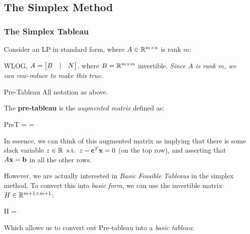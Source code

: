 \subsection{The Simplex Method}
\label{sec:simplex-method}

\subsubsection{The Simplex Tableau}

Consider an LP in standard form, where $A \in \mathbb{R}^{m \times n}$ is rank  $m$:

WLOG, $A = \begin{bmatrix} B & | & N \end{bmatrix}$. where $B = \mathbb{R}^{m\times m}$ invertible. \textit{Since
$A$ is rank $m$, we can row-reduce to make this true}.

\begin{defn}{Pre-Tableau}{}
All notation as above.

\medskip
The \textbf{pre-tableau} is the \textit{augmented matrix} defined as:

\begin{frml}
	PreT =  =
\end{frml}

\end{defn}

In essence, we can think of this augmented matrix as implying that there is some
slack variable $z \in \mathbb{R} \;\; \text{s.t.} \;\; z - \mathbf{c}^T\mathbf{x} = 0$ (on the top row), and
asserting that $A\mathbf{x} = \mathbf{b}$ in all the other rows.

However, we are actually interested in \textit{Basic Feasible Tableaus} in the simplex method.
To convert this into \textit{basic form}, we can use the invertible matrix 
$H \in \mathbb{R}^{m+1 \times m+1}$:

\begin{frml}
	H = 
\end{frml}

Which allows us to convert out Pre-tableau into a \textit{basic tableau}:

